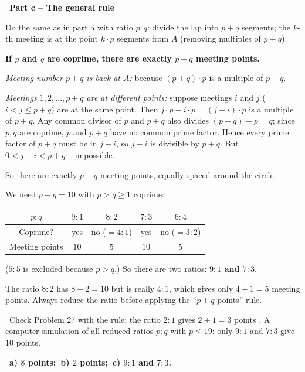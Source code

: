 \documentclass[11pt]{article}
\providecommand{\AnsWord}{Đáp số}
\newcommand{\ans}[1]{\par\smallskip{\bfseries\color{tmGreen!88!black}\AnsWord:}\ {\bfseries\color{AnsRed}#1}\par}
\newcommand{\step}[2]{\par\smallskip\noindent{\bfseries\color{tmBlue!85!black}\StepWord~#1.}\ {\bfseries #2}\par\nopagebreak}
\newcommand{\verify}[1]{\par\smallskip\noindent{\bfseries\color{tmGreen!80!black}\faCheckCircle\ \CheckWord}\ #1\par}
\def\AnsWord{Answer}
\def\StepWord{Step}
\def\CheckWord{Check:}
\begin{document}
{\step{3}{Part c -- The general rule}
Do the same as in part a with ratio $p:q$: divide the lap into $p+q$ segments; the $k$-th meeting is at the point $k\cdot p$ segments from $A$ (removing multiples of $p+q$).
\begin{proofbox}\textbf{If $p$ and $q$ are coprime, there are exactly $p+q$ meeting points.}\par
\emph{Meeting number $p+q$ is back at $A$:} because $(p+q)\cdot p$ is a multiple of $p+q$.\par
\emph{Meetings $1,2,\dots,p+q$ are at different points:} suppose meetings $i$ and $j$ ($i<j\le p+q$) are at the same point. Then $j\cdot p-i\cdot p=(j-i)\cdot p$ is a multiple of $p+q$. Any common divisor of $p$ and $p+q$ also divides $(p+q)-p=q$; since $p,q$ are coprime, $p$ and $p+q$ have no common prime factor. Hence every prime factor of $p+q$ must be in $j-i$, so $j-i$ is divisible by $p+q$. But $0<j-i<p+q$ -- impossible.\par
So there are exactly $p+q$ meeting points, equally spaced around the circle.\end{proofbox}
We need $p+q=10$ with $p>q\ge 1$ coprime:
\begin{center}
\begin{tabular}{|c|c|c|c|c|}
\hline
\rowcolor{tmBlue!10}$p:q$ & $9:1$ & $8:2$ & $7:3$ & $6:4$\\ \hline
Coprime? & yes & no ($=4:1$) & yes & no ($=3:2$)\\ \hline
Meeting points & $10$ & $5$ & $10$ & $5$\\ \hline
\end{tabular}
\end{center}
($5:5$ is excluded because $p>q$.) So there are two ratios: \textbf{$9:1$ and $7:3$}.
\begin{warnbox}The ratio $8:2$ has $8+2=10$ but is really $4:1$, which gives only $4+1=5$ meeting points. Always reduce the ratio before applying the ``$p+q$ points'' rule.\end{warnbox}
\verify{Check Problem 27 with the rule: the ratio $2:1$ gives $2+1=3$ points \checkmark. A computer simulation of all reduced ratios $p:q$ with $p\le 19$: only $9:1$ and $7:3$ give $10$ points.}
\ans{a) $8$ points;\ b) $2$ points;\ c) $9:1$ and $7:3$.}
}
\end{document}
